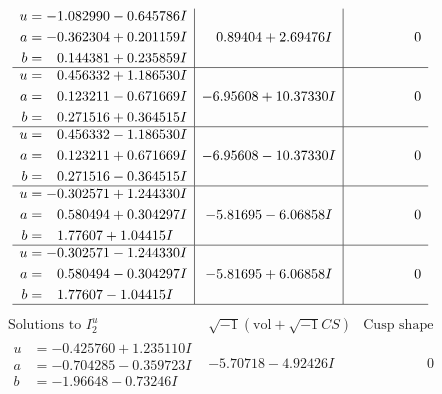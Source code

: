 \documentclass[1p]{elsarticle_modified}
\theoremstyle{definition}
\newcommand{\I}{\sqrt{-1}}
\begin{document}
$$\begin{array}{c|c|c}
\begin{aligned}
u &= -1.082990 - 0.645786 I \\
a &= -0.362304 + 0.201159 I \\
b &= \phantom{-}0.144381 + 0.235859 I\end{aligned}
 & \phantom{-}0.89404 + 2.69476 I & \phantom{-0.000000 } 0 \\ \hline\begin{aligned}
u &= \phantom{-}0.456332 + 1.186530 I \\
a &= \phantom{-}0.123211 - 0.671669 I \\
b &= \phantom{-}0.271516 + 0.364515 I\end{aligned}
 & -6.95608 + 10.37330 I & \phantom{-0.000000 } 0 \\ \hline\begin{aligned}
u &= \phantom{-}0.456332 - 1.186530 I \\
a &= \phantom{-}0.123211 + 0.671669 I \\
b &= \phantom{-}0.271516 - 0.364515 I\end{aligned}
 & -6.95608 - 10.37330 I & \phantom{-0.000000 } 0 \\ \hline\begin{aligned}
u &= -0.302571 + 1.244330 I \\
a &= \phantom{-}0.580494 + 0.304297 I \\
b &= \phantom{-}1.77607 + 1.04415 I\end{aligned}
 & -5.81695 - 6.06858 I & \phantom{-0.000000 } 0 \\ \hline\begin{aligned}
u &= -0.302571 - 1.244330 I \\
a &= \phantom{-}0.580494 - 0.304297 I \\
b &= \phantom{-}1.77607 - 1.04415 I\end{aligned}
 & -5.81695 + 6.06858 I & \phantom{-0.000000 } 0\\
 \hline 
 \end{array}$$\newpage$$\begin{array}{c|c|c}  
\text{Solutions to }I^u_{2}& \I (\text{vol} + \sqrt{-1}CS) & \text{Cusp shape}\\
 \hline 
\begin{aligned}
u &= -0.425760 + 1.235110 I \\
a &= -0.704285 - 0.359723 I \\
b &= -1.96648 - 0.73246 I\end{aligned}
 & -5.70718 - 4.92426 I & \phantom{-0.000000 } 0 \\ \hline\begin{aligned}

\end{aligned}
\end{array}$$
\end{document}
